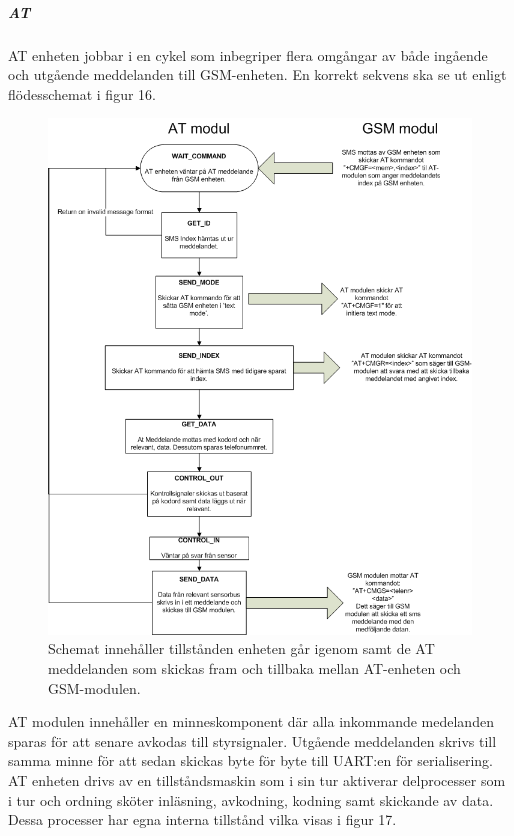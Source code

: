\documentclass[a4paper]{scrartcl}
\begin{document}
		\subparagraph{AT}
		AT enheten jobbar i en cykel som inbegriper flera omgångar av både ingående och utgående meddelanden till GSM-enheten. En korrekt sekvens ska se ut enligt flödesschemat i figur 16. 
		\begin{figure}[H]
			\centering
			\includegraphics[scale=0.6]{atflow.png}
			\caption{Schemat innehåller tillstånden enheten går igenom samt de AT meddelanden som skickas fram och tillbaka mellan AT-enheten och GSM-modulen.}
		\end{figure}

		AT modulen innehåller en minneskomponent där alla inkommande medelanden sparas för att senare avkodas till styrsignaler. Utgående meddelanden skrivs till samma minne för att sedan skickas byte för byte till UART:en för serialisering.
		AT enheten drivs av en tillståndsmaskin som i sin tur aktiverar delprocesser som i tur och ordning sköter inläsning, avkodning, kodning samt skickande av data. Dessa processer har egna interna tillstånd vilka visas i figur 17.
\end{document}
